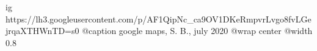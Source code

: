  
 
 
 
 


\ifcmt
	ig https://lh3.googleusercontent.com/p/AF1QipNc_ca9OV1DKeRmpvrLvgo8fvLGejrqaXTHWnTD=s0
	@caption google maps, S. B., july 2020
  @wrap center
  @width 0.8
\fi

